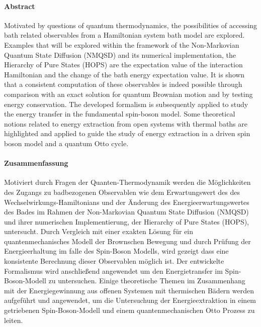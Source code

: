\paragraph{Abstract}

Motivated by questions of quantum thermodynamics, the possibilities of
accessing bath related observables from a Hamiltonian system bath
model are explored.  Examples that will be explored within the
framework of the Non-Markovian Quantum State Diffusion (NMQSD) and its
numerical implementation, the Hierarchy of Pure States (HOPS) are the
expectation value of the interaction Hamiltonian and the change of the
bath energy expectation value.  It is shown that a consistent
computation of these observables is indeed possible through comparison
with an exact solution for quantum Brownian motion and by testing
energy conservation.  The developed formalism is subsequently applied
to study the energy transfer in the fundamental spin-boson model. Some
theoretical notions related to energy extraction from open systems
with thermal baths are highlighted and applied to guide the study of
energy extraction in a driven spin boson model and a quantum Otto
cycle.


\paragraph{Zusammenfassung}


Motiviert durch Fragen der Quanten-Thermodynamik werden die
Möglichkeiten des Zugangs zu badbezogenen Observablen wie dem
Erwartungswert des des Wechselwirkungs-Hamiltonians und der Änderung
des Energieerwartungswertes des Bades im Rahmen der Non-Markovian
Quantum State Diffusion (NMQSD) und ihrer numerischen Implementierung,
der Hierarchy of Pure States (HOPS), untersucht.  Durch Vergleich mit
einer exakten Lösung für ein quantenmechanisches Modell der Brownschen
Bewegung und durch Prüfung der Energieerhaltung im falle des
Spin-Boson Modells, wird gezeigt dass eine konsistente Berechnung
dieser Observablen möglich ist.  Der entwickelte Formalismus wird
anschließend angewendet um den Energietransfer im Spin-Boson-Modell zu
untersuchen. Einige theoretische Themen im Zusammenhang mit der
Energiegewinnung aus offenen Systemen mit thermischen Bädern werden
aufgef\"uhrt und angewendet, um die Untersuchung der Energieextraktion
in einem getriebenen Spin-Boson-Modell und einem quantenmechanischen
Otto Prozess zu leiten.
